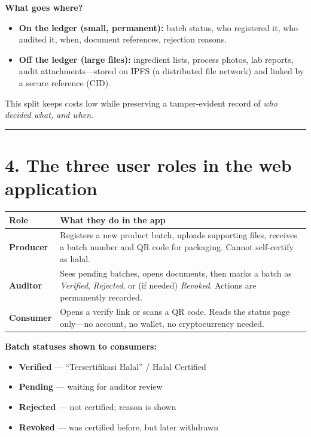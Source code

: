 \documentclass[11pt,a4paper]{article}
\newcommand{\sectionline}{\vspace{0.3em}\noindent\rule{\textwidth}{0.6pt}\vspace{0.6em}}
\begin{document}
\vspace{0.4em}
\noindent
\textbf{What goes where?}
\begin{itemize}[leftmargin=1.4em, itemsep=0.2em]
  \item \textbf{On the ledger (small, permanent):} batch status, who registered it, who audited it, when, document references, rejection reasons.
  \item \textbf{Off the ledger (large files):} ingredient lists, process photos, lab reports, audit attachments---stored on IPFS (a distributed file network) and linked by a secure reference (CID).
\end{itemize}

\noindent
This split keeps costs low while preserving a tamper-evident record of \emph{who decided what, and when}.

\sectionline

\section*{4. The three user roles in the web application}

\begin{tabularx}{\textwidth}{@{}>{\raggedright\arraybackslash}p{2.1cm}X@{}}
\toprule
\textbf{Role} & \textbf{What they do in the app} \\
\midrule
\textbf{Producer} & Registers a new product batch, uploads supporting files, receives a batch number and QR code for packaging. Cannot self-certify as halal. \\
\textbf{Auditor} & Sees pending batches, opens documents, then marks a batch as \emph{Verified}, \emph{Rejected}, or (if needed) \emph{Revoked}. Actions are permanently recorded. \\
\textbf{Consumer} & Opens a verify link or scans a QR code. Reads the status page only---no account, no wallet, no cryptocurrency needed. \\
\bottomrule
\end{tabularx}

\vspace{0.5em}
\noindent
\textbf{Batch statuses shown to consumers:}
\begin{itemize}[leftmargin=1.4em, itemsep=0.15em]
  \item \textcolor{halalgreen}{\textbf{Verified}} --- ``Tersertifikasi Halal'' / Halal Certified
  \item \textcolor{halalamber}{\textbf{Pending}} --- waiting for auditor review
  \item \textcolor{halalred}{\textbf{Rejected}} --- not certified; reason is shown
  \item \textbf{Revoked} --- was certified before, but later withdrawn
\end{itemize}
\end{document}
